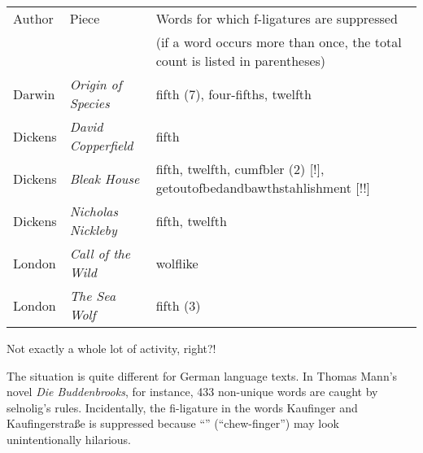 \documentclass[11pt]{article}
\newcommand{\pkg}[1]{\textsf{#1}}
\begin{document}
{\ebg {}
\RaggedRight 

\smallskip\noindent 
\begin{tabularx}{\textwidth}{@{}llX@{}}
\toprule
Author & Piece & Words for which f-ligatures are suppressed\\
& & (if a word occurs more than once, the total count is listed in parentheses)\\
\midrule
Darwin & \emph{Origin of Species} & fifth (7), four-fifths, twelfth\\
Dickens & \emph{David Copperfield} & fifth \\
Dickens & \emph{Bleak House} & fifth, twelfth, cumfbler (2) [!], getoutofbedandbawthstahlishment [!!]\\
Dickens & \emph{Nicholas Nickleby} & fifth, twelfth\\
London & \emph{Call of the Wild} & wolflike\\
London & \emph{The Sea Wolf} & fifth (3)\\
\bottomrule
\end{tabularx}
}

\enlargethispage{1\baselineskip}

\smallskip
Not exactly a whole lot of activity, right?!


The situation is quite different for German language texts. In Thomas Mann's novel \emph{Die Buddenbrooks}, for instance, 433 non-unique words are caught by \pkg{selnolig}'s rules. Incidentally, the fi-ligature in the words Kaufinger and Kaufingerstraße is suppressed because  \enquote{} (\enquote{chew-finger}) may look unintentionally hilarious.
\end{document}
